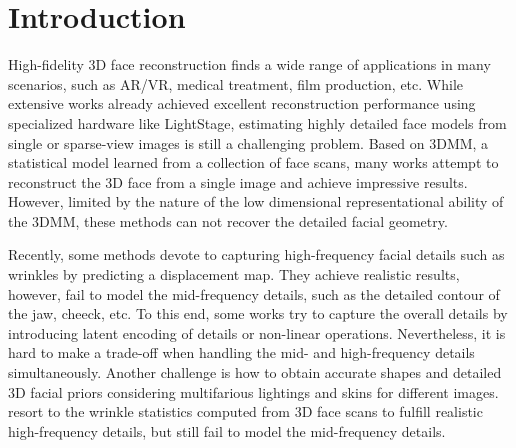 \documentclass[10pt,twocolumn,letterpaper]{article}
\begin{document}
\vspace{-17pt}

\section{Introduction}

\vspace{-1pt}

High-fidelity 3D face reconstruction finds a wide range of applications in many scenarios, such as AR/VR, medical treatment, film production, etc. While extensive works already achieved excellent reconstruction performance using specialized hardware like LightStage\cite{2009The, cao2018sparse, ma2007rapid}, estimating highly detailed face models from single or sparse-view images is still a challenging 
problem. Based on 3DMM\cite{blanz1999morphable}, a statistical model learned from a collection of face scans, many works\cite{2019GANFIT, 2020AvatarMe, 2021Towards, 2022Fast} attempt to reconstruct the 3D face from a single image and achieve impressive results. However, limited by the nature of the low dimensional representational ability of the 3DMM, these methods can not recover the detailed facial geometry.

Recently, some methods\cite{chen2019photo,2018CNN,2017Learning} devote to capturing high-frequency facial details such as wrinkles by predicting a displacement map. They achieve realistic results, however, fail to model the mid-frequency details, such as the detailed contour of the jaw, cheeck, etc. To this end, some works try to capture the overall details by introducing latent encoding of details\cite{feng2021learning} or non-linear operations\cite{2019Towards, feng2018joint}. Nevertheless, it is hard to make a trade-off when handling the mid- and high-frequency details simultaneously. 
Another challenge is how to obtain accurate shapes and detailed 3D facial priors considering multifarious lightings and skins for different images.
\cite{chen2019photo, 2015Real} resort to the wrinkle statistics computed from 3D face scans to fulfill realistic high-frequency details, but still fail to model the mid-frequency details.
\end{document}
